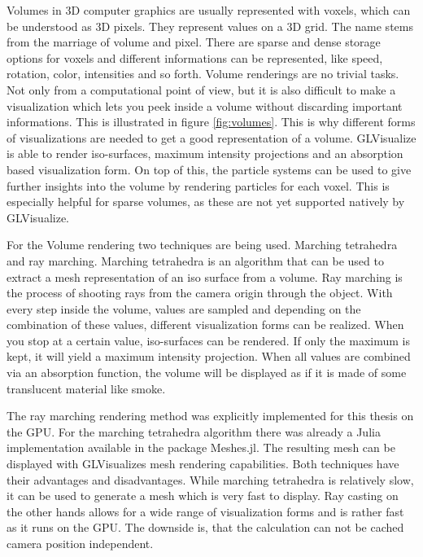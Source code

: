Volumes in 3D computer graphics are usually represented with voxels, which can be understood as 3D pixels. 
They represent values on a 3D grid. The name stems from the marriage of volume and pixel.
There are sparse and dense storage options for voxels and different informations can be represented, like speed, rotation, color, intensities and so forth.
Volume renderings are no trivial tasks. Not only from a computational point of view, but it is also difficult to make a visualization which lets you peek inside a volume without discarding important informations. This is illustrated in figure \ref{fig:volumes}.
This is why different forms of visualizations are needed to get a good representation of a volume.
GLVisualize is able to render iso-surfaces, maximum intensity projections and an absorption based visualization form. 
On top of this, the particle systems can be used to give further insights into the volume by rendering particles for each voxel. This is especially helpful for sparse volumes, as these are not yet supported natively by GLVisualize.

For the Volume rendering two techniques are being used. 
Marching tetrahedra and ray marching. 
Marching tetrahedra is an algorithm that can be used to extract a mesh representation of an iso surface from a volume.
Ray marching is the process of shooting rays from the camera origin through the object.
With every step inside the volume, values are sampled and depending on the combination of these values, different visualization forms can be realized. When you stop at a certain value, iso-surfaces can be rendered. 
If only the maximum is kept, it will yield a maximum intensity projection. 
When all values are combined via an absorption function, the volume will be displayed as if it is made of some translucent material like smoke.

The ray marching rendering method was explicitly implemented for this thesis on the GPU. For the marching tetrahedra algorithm there was already a Julia implementation available in the package Meshes.jl\cite{Tedrahedra}. The resulting mesh can be displayed with GLVisualizes mesh rendering capabilities.
Both techniques have their advantages and disadvantages. 
While marching tetrahedra is relatively slow, it can be used to generate a mesh which is very fast to display. 
Ray casting on the other hands allows for a wide range of visualization forms and is rather fast as it runs on the GPU. The downside is, that the calculation can not be cached camera position independent.
 

